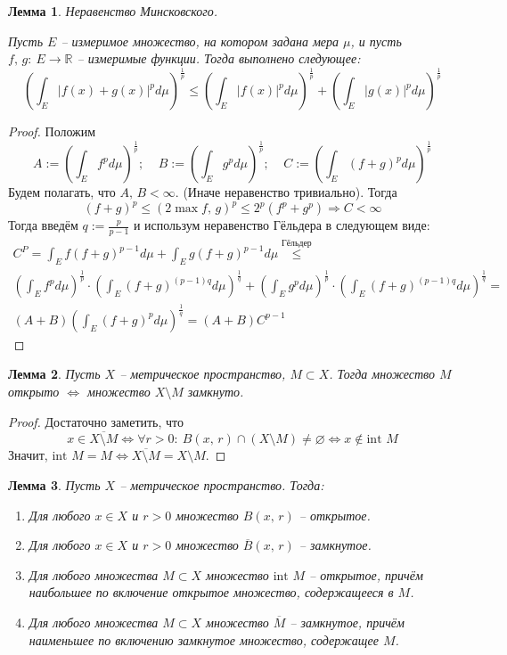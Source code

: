 \documentclass[a4paper,12pt]{article}
\renewcommand{\leq}{\ensuremath{\leqslant}}
\renewcommand{\emptyset}{\ensuremath{\varnothing}}
\theoremstyle{plain}
\newtheorem{lemma}{Лемма}[section]
\theoremstyle{definition}
\theoremstyle{remark}
\begin{document}
\begin{lemma}
	Неравенство Минсковского.

	Пусть $E$ -- измеримое множество, на котором задана мера $\mu$, и пусть $f,\,g :\: E \to \mathbb{R}$ -- измеримые функции. Тогда выполнено следующее:
	\[
		\left(\int_E \vert f(x) + g(x)\vert^pd\mu\right)^{\frac{1}{p}} \leq \left(\int_E \vert f(x)\vert^p d\mu\right)^{\frac{1}{p}} + \left(\int_E \vert g(x)\vert^pd\mu\right)^{\frac{1}{p}}
	\]
\end{lemma}

\begin{proof}
	Положим
	\[
		A := \left(\int_Ef^pd\mu\right)^{\frac{1}{p}} ;\;\;\;\; B := \left(\int_Eg^pd\mu\right)^{\frac{1}{p}} ;\;\;\;\; C := \left(\int_E(f + g)^pd\mu\right)^{\frac{1}{p}}
	\]
	Будем полагать, что $A,\,B < \infty$. (Иначе неравенство тривиально). Тогда
	\[
		(f + g)^p \leq (2\max{f,\,g})^p \leq 2^p(f^p + g^p) \Rightarrow C < \infty
	\]
	Тогда введём $q := \frac{p}{p-1}$ и использум неравенство Гёльдера в следующем виде:
	\begin{align*}
		C^P = \int_E f(f + g)^{p - 1}d\mu + \int_Eg(f + g)^{p-1}d\mu \overset{\text{Гёльдер}}{\leq}\\
		\left(\int_E f^pd\mu\right)^{\frac{1}{p}}\cdot\left(\int_E(f + g)^{(p - 1)q}d\mu\right)^{\frac{1}{q}} + \left(\int_Eg^pd\mu\right)^{\frac{1}{p}}\cdot\left(\int_E(f + g)^{(p-1)q}d\mu\right)^{\frac{1}{q}}=\\
		(A + B)\left(\int_E (f + g)^pd\mu\right)^{\frac{1}{q}} = (A + B)C^{p -1}
	\end{align*}
\end{proof}

\begin{lemma}
	Пусть $X$ -- метрическое пространство, $M \subset X$. Тогда множество $M$ открыто $\Leftrightarrow$ множество $X \setminus M$ замкнуто.
\end{lemma}

\begin{proof}
	Достаточно заметить, что
	\[
		x \in \overline{X \setminus M} \Leftrightarrow \forall r > 0 :\: B(x,\, r) \cap (X \setminus M) \neq \emptyset \Leftrightarrow x \not\in \text{int }M
	\]
	Значит, $\text{int }M = M \Leftrightarrow \overline{X \setminus M} = X \setminus M$.
\end{proof}

\begin{lemma}
	Пусть $X$ -- метрическое пространство. Тогда:
	\begin{enumerate}
		\item Для любого $x \in X$ и $r > 0$ множество $B(x,\,r)$ -- открытое.
		\item Для любого $x \in X$ и $r > 0$ множество $\overline{B}(x,\,r)$ -- замкнутое.
		\item Для любого множества $M \subset X$ множество $\text{int }M$ -- открытое, причём наибольшее по включение открытое множество, содержащееся в $M$.
		\item Для любого множества $M \subset X$ множество $\overline{M}$ -- замкнутое, причём наименьшее по включению замкнутое множество, содержащее $M$.
	\end{enumerate}
\end{lemma}
\end{document}
